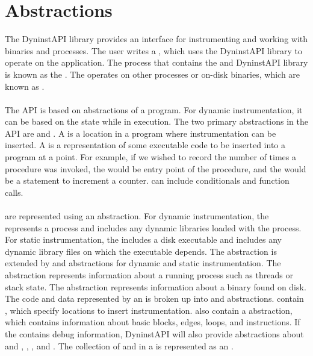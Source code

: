 \section{Abstractions}
The DyninstAPI library provides an interface for instrumenting and working with binaries and processes.  The user writes a \mutator, which uses the DyninstAPI library to operate on the application.  The process that contains the \mutator and DyninstAPI library is known as the \mutatorprocess.  The \mutatorprocess  operates on other processes or on-disk binaries, which are known as \mutatees.\\\\   
The API is based on abstractions of a program.  For dynamic instrumentation, it can be based on the state while in execution.  The two primary abstractions in the API are \points and \snippets.  A \point is a location in a program where instrumentation can be inserted.  A \snippet is a representation of some executable code to be inserted into a program at a point.  For example, if we wished to record the number of times a procedure was invoked, the \point would be entry point of the procedure, and the \snippets would be a statement to increment a counter.  \Snippets can include conditionals and function calls.\\\\

\Mutatees are represented using an \addressspace abstraction.  For dynamic instrumentation, the \addressspace represents a process and includes any dynamic libraries loaded with the process. For static instrumentation, the \addressspace includes a disk executable and includes any dynamic library files on which the executable depends.  The \addressspace abstraction is extended by \process and \binary abstractions for dynamic and static instrumentation.  The \process abstraction represents information about a running process such as threads or stack state.  The \binary abstraction represents information about a binary found on disk.\\

The code and data represented by an \addressspace is broken up into \function and \variable abstractions.  \Functions contain \points, which specify locations to insert instrumentation.  \Functions also contain a \controlflowgraph abstraction, which contains information about basic blocks, edges, loops, and instructions.  If the \mutatee contains debug information, DyninstAPI will also provide abstractions about \variable and \function \types, \localvariables, \functionparameters, and \sourcecodelineinformation.  The collection of \functions and \variables in a \mutatee is represented as an \image.\\\\

